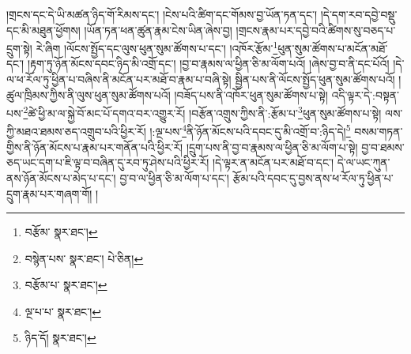 །གྲངས་དང་དེ་ཡི་མཚན་ཉིད་གོ་རིམས་དང་། །ངེས་པའི་ཚིག་དང་གོམས་བྱ་ཡོན་ཏན་དང་། །དེ་དག་རབ་དབྱེ་བསྡུ་དང་མི་མཐུན་ཕྱོགས། །ཡོན་ཏན་ཕན་ཚུན་རྣམ་ངེས་ཡིན་ཞེས་བྱ། །གྲངས་རྣམ་པར་དབྱེ་བའི་ཚིགས་སུ་བཅད་པ་དྲུག་སྟེ། རེ་ཞིག །ལོངས་སྤྱོད་དང་ལུས་ཕུན་སུམ་ཚོགས་པ་དང་། །འཁོར་རྩོམ་\footnote{བརྩོམ་  སྣར་ཐང་། }ཕུན་སུམ་ཚོགས་པ་མངོན་མཐོ་དང་། །རྟག་ཏུ་ཉོན་མོངས་དབང་ཉིད་མི་འགྲོ་དང་། །བྱ་བ་རྣམས་ལ་ཕྱིན་ཅི་མ་ལོག་པའོ། །ཞེས་བྱ་བ་ནི་དང་པོའོ། །དེ་ལ་ཕ་རོལ་ཏུ་ཕྱིན་པ་བཞིས་ནི་མངོན་པར་མཐོ་བ་རྣམ་པ་བཞི་སྟེ། སྦྱིན་པས་ནི་ལོངས་སྤྱོད་ཕུན་སུམ་ཚོགས་པའོ། །ཚུལ་ཁྲིམས་ཀྱིས་ནི་ལུས་ཕུན་སུམ་ཚོགས་པའོ། །བཟོད་པས་ནི་འཁོར་ཕུན་སུམ་ཚོགས་པ་སྟེ། འདི་ལྟར་དེ་:བསྟན་པས་\footnote{བསྙེན་པས་  སྣར་ཐང་།  པེ་ཅིན། }ཚེ་ཕྱི་མ་ལ་སྐྱེ་བོ་མང་པོ་དགའ་བར་འགྱུར་རོ། །བརྩོན་འགྲུས་ཀྱིས་ནི་:རྩོམ་པ་\footnote{བརྩོམ་པ་  སྣར་ཐང་། }ཕུན་སུམ་ཚོགས་པ་སྟེ། ལས་ཀྱི་མཐའ་ཐམས་ཅད་འགྲུབ་པའི་ཕྱིར་རོ། །:ལྔ་པས་\footnote{ལྔ་པ་པ་  སྣར་ཐང་། }ནི་ཉོན་མོངས་པའི་དབང་དུ་མི་འགྲོ་བ་:ཉིད་དེ།\footnote{ཉིད་དོ།  སྣར་ཐང་། } བསམ་གཏན་གྱིས་ནི་ཉོན་མོངས་པ་རྣམ་པར་གནོན་པའི་ཕྱིར་རོ། །དྲུག་པས་ནི་བྱ་བ་རྣམས་ལ་ཕྱིན་ཅི་མ་ལོག་པ་སྟེ། བྱ་བ་ཐམས་ཅད་ཡང་དག་པ་ཇི་ལྟ་བ་བཞིན་དུ་རབ་ཏུ་ཤེས་པའི་ཕྱིར་རོ། །དེ་ལྟར་ན་མངོན་པར་མཐོ་བ་དང་། དེ་ལ་ཡང་ཀུན་ནས་ཉོན་མོངས་པ་མེད་པ་དང་། བྱ་བ་ལ་ཕྱིན་ཅི་མ་ལོག་པ་དང་། རྩོམ་པའི་དབང་དུ་བྱས་ནས་ཕ་རོལ་ཏུ་ཕྱིན་པ་དྲུག་རྣམ་པར་གཞག་གོ། །
